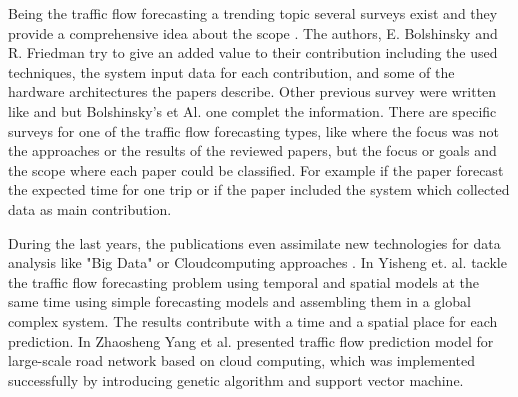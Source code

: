 \documentclass[preprint]{elsarticle}
\begin{document}

Being the traffic flow forecasting a trending topic several surveys exist and they provide a comprehensive idea about the scope \cite{SurveyBolshinsky2012}. The authors, E. Bolshinsky and R. Friedman try to give an added value to their contribution including the used techniques, the system input data for each contribution, and some of the hardware architectures the papers describe. Other previous survey were written like \cite{Survey2004} and \cite{SurveyKumar2007} but Bolshinsky's et Al. one complet the information. There are specific surveys for one of the traffic flow forecasting types, like \cite{Vlahogianni2014} where the focus was not the approaches or the results of the reviewed papers, but the focus or goals and the scope where each paper could be classified. For example if the paper forecast the expected time for one trip or if the paper included the system which collected data as main contribution.


During the last years, the publications even assimilate new technologies for data analysis like "Big Data" \cite{TrafficFlowPredictionWithBigData2015} or Cloudcomputing approaches \citep{CloudComputing2014}. In \cite{TrafficFlowPredictionWithBigData2015} Yisheng et. al. tackle the traffic flow forecasting problem using temporal and spatial models at the same time using simple forecasting models and assembling them in a global complex system. The results contribute with a time and a spatial place for each prediction. In \citep{CloudComputing2014} Zhaosheng Yang et al. presented traffic flow prediction model for large-scale road network based on cloud computing, which was implemented successfully by introducing genetic algorithm and support vector machine.
\end{document}
